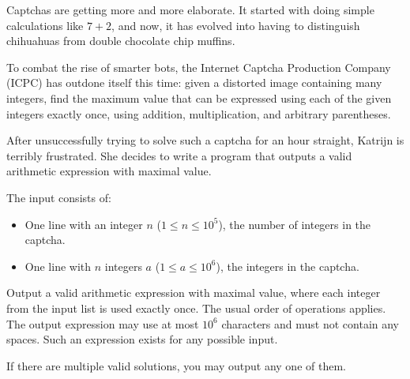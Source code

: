 
%
Captchas are getting more and more elaborate.
It started with doing simple calculations like $7 + 2$, and now, it has evolved into having to distinguish chihuahuas from double chocolate chip muffins.

To combat the rise of smarter bots, the Internet Captcha Production Company (ICPC) has outdone itself this time:
given a distorted image containing many integers, find the maximum value that can be expressed using each of the given integers exactly once, using addition, multiplication, and arbitrary parentheses.

After unsuccessfully trying to solve such a captcha for an hour straight, Katrijn is terribly frustrated.
She decides to write a program that outputs a valid arithmetic expression with maximal value.

\begin{Input}
  The input consists of:
  \begin{itemize}
    \item One line with an integer $n$ ($1 \le n \le 10^5$), the number of integers in the captcha.
    \item One line with $n$ integers $a$ ($1 \le a \le 10^6$), the integers in the captcha.
  \end{itemize}
\end{Input}

\begin{Output}
  Output a valid arithmetic expression with maximal value, where each integer from the input list is used exactly once.
  The usual order of operations applies.
  The output expression may use at most $10^6$ characters and must not contain any spaces.
  Such an expression exists for any possible input.

  If there are multiple valid solutions, you may output any one of them.
\end{Output}
